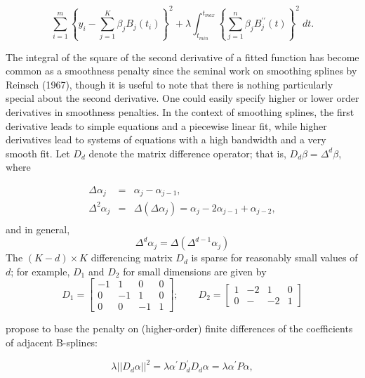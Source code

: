 \documentclass[12pt]{article}
\theoremstyle{definition}
\begin{document}
\begin{equation} \label{eq:univariate_bspline_ridge_penalty}
\sum_{i=1}^m \left \{ y_i - \sum_{j=1}^K \beta_j B_j\left(t_i\right) \right \}^2 + \lambda \int_{t_{min}}^{t_{max}} \left\{  \sum_{j=1}^n \beta_j B^{\prime \prime}_j\left(t\right) \right\}^2 \; dt.
\end{equation}

The integral of the square of the second derivative of a fitted function has become common as a smoothness penalty since the seminal work on smoothing splines by Reinsch (1967), though it is useful to note that there is nothing particularly special about the second derivative. One could easily specify higher or lower order derivatives in smoothness penalties. In the context of smoothing splines, the first derivative leads to simple equations and a piecewise linear fit, while higher derivatives lead to systems of equations with a high bandwidth and a very smooth fit. Let $D_d$ denote the matrix difference operator; that is, $D_d\beta = \Delta^d \beta$, where

 \begin{eqnarray*}
 \Delta \alpha_j &=& \alpha_j - \alpha_{j-1},\\
 \Delta^2 \alpha_j &=& \Delta\left(\Delta \alpha_j\right) = \alpha_j - 2\alpha_{j-1} + \alpha_{j-2},\\ 
 \end{eqnarray*}
\noindent 
and in general,
\begin{equation*}
\Delta^d \alpha_j = \Delta\left(\Delta^{d-1} \alpha_j \right)
\end{equation*}
The $\left(K - d\right) \times K$ differencing matrix $D_d$ is sparse for reasonably small values of $d$; for example, $D_1$ and $D_2$ for small dimensions are given by 
\[
D_1 = \begin{bmatrix} -1&1&0&0\\ 0&-1&1&0\\ 0&0&-1&1 \end{bmatrix}; \qquad D_2 = \begin{bmatrix} 1&-2&1&0 \\ 0&-&-2&1\end{bmatrix}
\]

\cite{eilers1996flexible} propose to base the penalty on (higher-order) finite differences of the coefficients of adjacent B-splines:

 \[
 \lambda\vert \vert D_d\alpha\vert \vert^2 = \lambda \alpha^\prime D^\prime_d D_d \alpha = \lambda \alpha^\prime P\alpha,
 \] 
 
\end{document}
